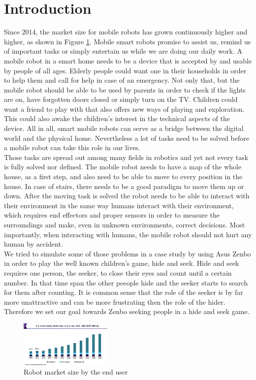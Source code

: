 \documentclass[conference]{IEEEtran}
\begin{document}
\section{Introduction}
Since 2014, the market size for mobile robots has grown continuously higher and higher, as shown in Figure \ref{fig:robotmarket}.
Mobile smart robots promise to assist us, remind us of important tasks or simply entertain us while we are doing our daily work.
A mobile robot in a smart home needs to be a device that is accepted by and usable by people of all ages.
Elderly people could want one in their households in order to help them and call for help in case of an emergency.
Not only that, but the mobile robot should be able to be used by parents in order to check if the lights are on, have forgotten doors closed
or simply turn on the TV. 
Children could want a friend to play with that also offers new ways of playing and exploration. 
This could also awake the children's interest in the technical aspects of the device. 
All in all, smart mobile robots can serve as a bridge between the digital world and the physical home.
Nevertheless a lot of tasks need to be solved before a mobile robot can take this role in our lives.\\
Those tasks are spread out among many fields in robotics and yet not every task is fully solved nor defined. 
The mobile robot needs to have a map of the whole house, as a first step, and also need to be able to move to every position in the house.
In case of stairs, there needs to be a good paradigm to move them up or down.
After the moving task is solved the robot needs to be able to interact with their environment in the same way humans interact with their environment, 
which requires end effectors and proper sensors in order to measure the surroundings and make, even in unknown environments, correct decisions.
Most importantly, when interacting with humans, the mobile robot should not hurt any human by accident.\\
We tried to simulate some of those problems in a case study by using Asus Zenbo in order to play the well known children's game, hide and seek.
Hide and seek requires one person, the seeker, to close their eyes and count until a certain number. 
In that time span the other peeople hide and the seeker starts to search
for them after counting. It is common sense that the role of the seeker is by far more unattractive and can be more frustrating
then the role of the hider. Therefore we set our goal towards Zenbo seeking people in a hide and seek game. \\
\begin{figure}[h]  \label{fig:robotmarket}
	\begin{center}
		\includegraphics[width=0.4\textwidth]{pics/robotMarket.png}
	\end{center}
	\caption{Robot market size by the end user \cite{b0}}
\end{figure} \\\\
\end{document}
